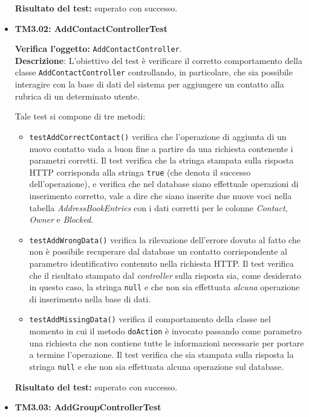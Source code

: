 \begin{itemize}
\begin{itemize}
\end{itemize}
\textbf{Risultato del test:} superato con successo.



\item \textbf{TM3.02: AddContactControllerTest}

\textbf{Verifica l'oggetto:} \texttt{AddContactController}.\\
\textbf{Descrizione}: L'obiettivo del test è verificare il corretto comportamento della classe \texttt{AddContactController} controllando, in particolare, che sia possibile interagire con la base di dati del sistema per aggiungere un contatto alla rubrica di un determinato utente.

Tale test si compone di tre metodi:
\begin{itemize}
\item \texttt{testAddCorrectContact()} verifica che l'operazione di aggiunta di un nuovo contatto vada a buon fine a partire da una richiesta contenente i parametri corretti. Il test verifica che la stringa stampata sulla risposta HTTP corrisponda alla stringa \texttt{true} (che denota il successo dell'operazione), e verifica che nel database siano effettuale operazioni di inserimento corretto, vale a dire che siano inserite due nuove voci nella tabella \textit{AddressBookEntries} con i dati corretti per le colonne \textit{Contact}, \textit{Owner} e \textit{Blocked}.

\item \texttt{testAddWrongData()} verifica la rilevazione dell'errore dovuto al fatto che non è possibile recuperare dal database un contatto corrispondente al parametro identificativo contenuto nella richiesta HTTP. Il test verifica che il risultato stampato dal \textit{controller} sulla risposta sia, come desiderato in questo caso, la stringa \texttt{null} e che non sia effettuata \textit{alcuna} operazione di inserimento nella base di dati.

\item \texttt{testAddMissingData()} verifica il comportamento della classe nel momento in cui il metodo \texttt{doAction} è invocato passando come parametro una richiesta che non contiene tutte le informazioni necessarie per portare a termine l'operazione. Il test verifica che sia stampata sulla risposta la stringa \texttt{null} e che non sia effettuata alcuna operazione sul database.
\end{itemize}
\textbf{Risultato del test:} superato con successo.


\item \textbf{TM3.03: AddGroupControllerTest}


\end{itemize}

